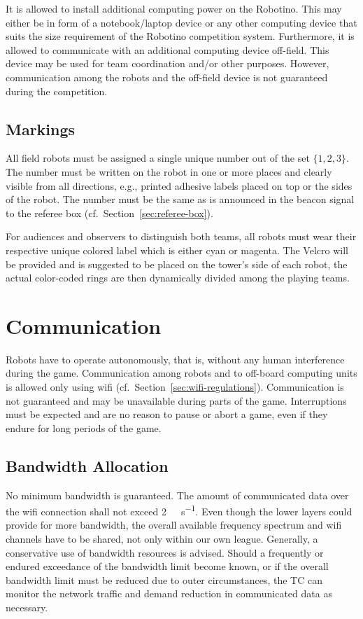 \documentclass[12pt,twoside]{article}
\newcommand{\Robotino}{Robotino}
\newcommand{\refsec}[1]{Section~\ref{#1}}
\begin{document}
It is allowed to install additional computing power on the
\Robotino. This may either be in form of a notebook/laptop device or
any other computing device that suits the size requirement of the
\Robotino{} competition system. Furthermore, it is allowed to
communicate with an additional computing device off-field. This device
may be used for team coordination and/or other purposes. However,
communication among the robots and the off-field device is not
guaranteed during the competition.

\subsection{Markings}
\label{sec:robot-markings}
All field robots must be assigned a single unique number out of the
set $\{1, 2, 3\}$. The number must be written on the robot in one or
more places and clearly visible from all directions, e.g., printed
adhesive labels placed on top or the sides of the robot. The number
must be the same as is announced in the beacon signal to the referee
box (cf.~\refsec{sec:referee-box}).

For audiences and observers to distinguish both teams, all robots must
wear their respective unique colored label which is either cyan or
magenta.  The Velcro will be provided and is suggested to be placed on
the tower's side of each robot, the actual color-coded rings are then
dynamically divided among the playing teams.

\section{Communication}
\label{sec:communication}

Robots have to operate autonomously, that is, without any human
interference during the game. Communication among robots and to
off-board computing units is allowed only using wifi
(cf.~\refsec{sec:wifi-regulations}). Communication is not guaranteed
and may be unavailable during parts of the game. Interruptions must be
expected and are no reason to pause or abort a game, even if they
endure for long periods of the game.

\subsection{Bandwidth Allocation}
\label{sec:bandwidth}
No minimum bandwidth is guaranteed. The amount of communicated data
over the wifi connection shall not exceed
\SI[per-mode=symbol]{2}{\mega\bit\per\second}. Even though the lower
layers could provide for more bandwidth, the overall available
frequency spectrum and wifi channels have to be shared, not only
within our own league. Generally, a conservative use of bandwidth
resources is advised. Should a frequently or endured exceedance of the
bandwidth limit become known, or if the overall bandwidth limit must
be reduced due to outer circumstances, the TC can monitor the network
traffic and demand reduction in communicated data as necessary.
\end{document}
